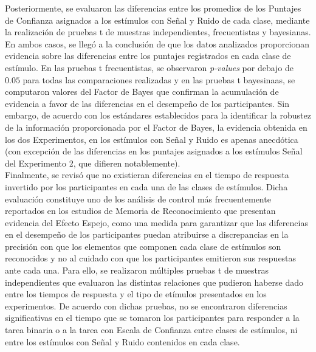 Posteriormente, se evaluaron las diferencias entre los promedios de los Puntajes de Confianza asignados a los estímulos con Señal y Ruido de cada clase, mediante la realización de pruebas t de muestras independientes, frecuentistas y bayesianas. En ambos casos, se llegó a la conclusión de que los datos analizados proporcionan evidencia sobre las diferencias entre los puntajes registrados en cada clase de estímulo. En las pruebas t frecuentistas, se observaron \textit{p-values} por debajo de $0.05$ para todas las comparaciones realizadas y en las pruebas t bayesinaas, se computaron valores del Factor de Bayes que confirman la acumulación de evidencia a favor de las diferencias en el desempeño de los participantes. Sin embargo, de acuerdo con los estándares establecidos para la identificar la robustez de la información proporcionada por el Factor de Bayes, la evidencia obtenida en los dos Experimentos, en los estímulos con Señal y Ruido es apenas anecdótica (con excepción de las diferencias en los puntajes asignados a los estímulos Señal del Experimento 2, que difieren notablemente).\\

Finalmente, se revisó que no existieran diferencias en el tiempo de respuesta invertido por los participantes en cada una de las clases de estímulos. Dicha evaluación constituye uno de los análisis de control más frecuentemente reportados en los estudios de Memoria de Reconocimiento que presentan evidencia del Efecto Espejo, como una medida para garantizar que las diferencias en el desempeño de los participantes puedan atribuirse a discrepancias en la precisión con que los elementos que componen cada clase de estímulos son reconocidos y no al cuidado con que los participantes emitieron sus respuestas ante cada una. Para ello, se realizaron múltiples pruebas t de muestras independientes que evaluaron las distintas relaciones que pudieron haberse dado entre los tiempos de respuesta y el tipo de etímulos presentados en los experimentos. De acuerdo con dichas pruebas, no se encontraron diferencias significativas en el tiempo que se tomaron los participantes para responder a la tarea binaria o a la tarea con Escala de Confianza entre clases de estímulos, ni entre los estímulos con Señal y Ruido contenidos en cada clase.\\ 

